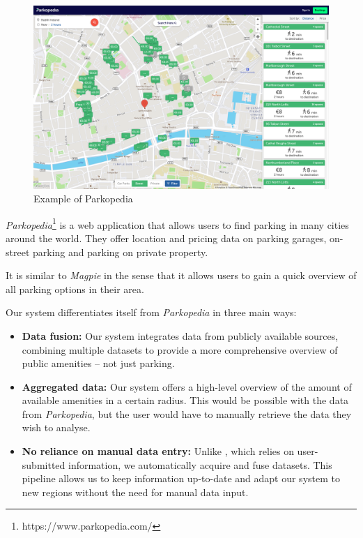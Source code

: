 \begin{figure}[htbp]
  \centering
  \includegraphics[width=\columnwidth]{images/parkopedia.png}
  \caption{Example of Parkopedia}
  \label{fig:parkopedia}
\end{figure}

\textit{Parkopedia}\footnote{https://www.parkopedia.com/} is a web
application that allows users to find parking in many cities around the world.
They offer location and pricing data on parking garages, on-street parking and
parking on private property.

It is similar to \textit{Magpie} in the sense that it allows users to
gain a quick overview of all parking options in their area.

Our system differentiates itself from \textit{Parkopedia} in three
main ways:
\vspace{-3mm}
\begin{itemize}
  \item{\textbf{Data fusion:} Our system integrates data from publicly available
  sources, combining multiple datasets to provide a more comprehensive overview
  of public amenities -- not just parking.}
  \vspace{1.25mm}

  \item{\textbf{Aggregated data:} Our system offers a high-level overview of the
  amount of available amenities in a certain radius. This would be possible with
  the data from \textit{Parkopedia}, but the user would have to manually
  retrieve the data they wish to analyse.}
  \vspace{1.25mm}

  \item{\textbf{No reliance on manual data entry:} Unlike
  , which relies on user-submitted information, we
  automatically acquire and fuse datasets. This pipeline allows us to keep
  information up-to-date and adapt our system to new regions without the need
  for manual data input.}
  \vspace{1.25mm}

\end{itemize}

